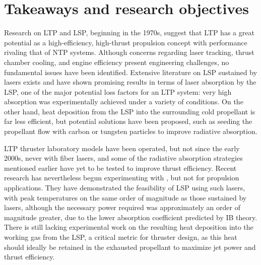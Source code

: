     \section{Takeaways and research objectives}
        Research on LTP and LSP, beginning in the 1970s, suggest that LTP has a great potential as a high-efficiency, high-thrust propulsion concept with performance rivaling that of NTP systems. Although concerns regarding laser tracking, thrust chamber cooling, and engine efficiency present engineering challenges, no fundamental issues have been identified. Extensive literature on LSP sustained by  lasers exists and have shown promising results in terms of laser absorption by the LSP, one of the major potential loss factors for an LTP system: very high absorption was experimentally achieved under a variety of conditions. On the other hand, heat deposition from the LSP into the surrounding cold propellant is far less efficient, but potential solutions have been proposed, such as seeding the propellant flow with carbon or tungsten particles to improve radiative absorption.

        LTP thruster laboratory models have been operated, but not since the early 2000s, never with fiber lasers, and some of the radiative absorption strategies mentioned earlier have yet to be tested to improve thrust efficiency. Recent research has nevertheless begun experimenting with , but not for propulsion applications. They have demonstrated the feasibility of LSP using such lasers, with peak temperatures on the same order of magnitude as those sustained by  lasers, although the necessary power required was approximately an order of magnitude greater, due to the lower absorption coefficient predicted by IB theory. There is still lacking experimental work on the resulting heat deposition into the working gas from the LSP, a critical metric for thruster design, as this heat should ideally be retained in the exhausted propellant to maximize jet power and thrust efficiency.

